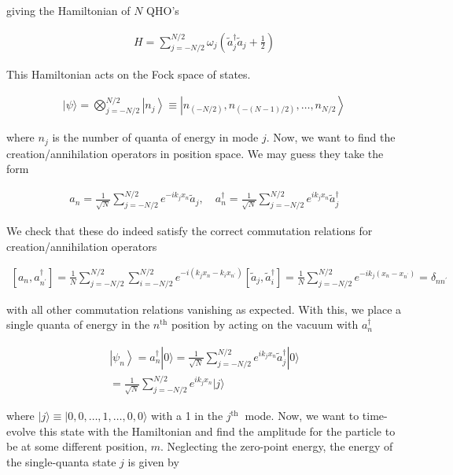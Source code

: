 \documentclass[pre,floatfix,onecolumn]{revtex4-2}
\begin{document}
giving the Hamiltonian of $N$ QHO's

\begin{align}
H = \sum_{j=-N / 2}^{N / 2} \omega_{j}\left(\tilde{a}_{j}^{\dagger} \tilde{a}_{j}+\frac{1}{2}\right)
\end{align}

This Hamiltonian acts on the Fock space of states.

\begin{align}
|\psi\rangle = \bigotimes_{j=-N / 2}^{N / 2}\left|n_{j}\right\rangle \equiv\left|n_{(-N / 2)}, n_{(-(N-1) / 2)}, \ldots, n_{N / 2}\right\rangle
\end{align}

where $n_{j}$ is the number of quanta of energy in mode $j$. Now, we want to find the creation/annihilation operators in position space. We may guess they take the form

\begin{align}
a_{n} = \frac{1}{\sqrt{N}} \sum_{j=-N / 2}^{N / 2} e^{-i k_{j} x_{n}} \tilde{a}_{j}, \quad a_{n}^{\dagger} = \frac{1}{\sqrt{N}} \sum_{j=-N / 2}^{N / 2} e^{i k_{j} x_{n}} \tilde{a}_{j}^{\dagger}
\end{align}

We check that these do indeed satisfy the correct commutation relations for creation/annihilation operators

\begin{align}
\left[a_{n}, a_{n^{\prime}}^{\dagger}\right] = \frac{1}{N} \sum_{j=-N / 2}^{N / 2} \sum_{i=-N / 2}^{N / 2} e^{-i\left(k_{j} x_{n}-k_{i} x_{n^{\prime}}\right)}\left[\tilde{a}_{j}, \tilde{a}_{i}^{\dagger}\right] 
= \frac{1}{N} \sum_{j=-N / 2}^{N / 2} e^{-i k_{j}\left(x_{n}-x_{n^{\prime}}\right)} = \delta_{n n^{\prime}}
\end{align}

with all other commutation relations vanishing as expected. With this, we place a single quanta of energy in the $n^{\text {th}}$ position by acting on the vacuum with $a_{n}^{\dagger}$

\begin{align}
\left|\psi_{n}\right\rangle = a_{n}^{\dagger}|0\rangle = \frac{1}{\sqrt{N}} \sum_{j=-N / 2}^{N / 2} e^{i k_{j} x_{n}} \tilde{a}_{j}^{\dagger}|0\rangle \\ 
= \frac{1}{\sqrt{N}} \sum_{j=-N / 2}^{N / 2} e^{i k_{j} x_{n}}|j\rangle
\end{align}

where $|j\rangle \equiv|0,0, \ldots, 1, \ldots, 0,0\rangle$ with a 1 in the $j^{\text {th }}$ mode. Now, we want to time-evolve this state with the Hamiltonian and find the amplitude for the particle to be at some different position, $m$. Neglecting the zero-point energy, the energy of the single-quanta state $j$ is given by
\end{document}
